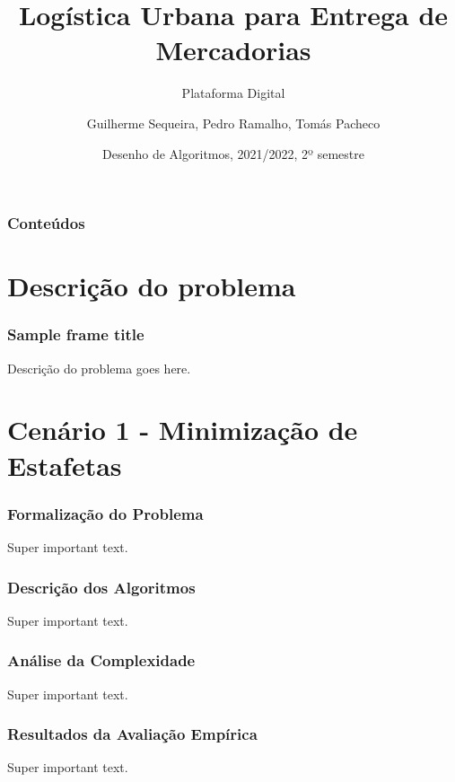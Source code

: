 \documentclass{beamer}
\title[Plataforma Digital]
{Logística Urbana para Entrega de Mercadorias}
\subtitle{Plataforma Digital}
\author[Grupo 30, 2LEIC03]
{Guilherme Sequeira, Pedro Ramalho, Tomás Pacheco}
\institute[FEUP]
{
  Faculdade de Engenheria\\
  Universidade do Porto
}
\date[2021/2022 2S]
{Desenho de Algoritmos, 2021/2022, 2º semestre}
\begin{document}

\frame{\titlepage}



\begin{frame}
  \frametitle{Conteúdos}
  \tableofcontents
\end{frame}






\section{Descrição do problema}


\begin{frame}
  \frametitle{Sample frame title}
    Descrição do problema goes here.  
\end{frame}








\section{Cenário 1 - Minimização de Estafetas}

\begin{frame}
  \frametitle{Formalização do Problema}
  Super important text.
\end{frame}

\begin{frame}
  \frametitle{Descrição dos Algoritmos}
  Super important text.
\end{frame}


\begin{frame}
  \frametitle{Análise da Complexidade}
  Super important text.
\end{frame}

\begin{frame}
  \frametitle{Resultados da Avaliação Empírica}
  Super important text.
\end{frame}
\end{document}
